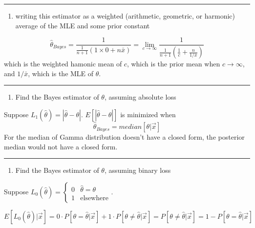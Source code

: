\documentclass[12pt,]{article}
\providecommand{\tightlist}{%
  \setlength{\itemsep}{0pt}\setlength{\parskip}{0pt}}
\begin{document}
\begin{center}\rule{0.5\linewidth}{\linethickness}\end{center}

\begin{enumerate}
\def\labelenumi{\alph{enumi}.}
\setcounter{enumi}{2}
\tightlist
\item
  \textcolor[rgb]{0.5,0.5,0.5}{writing this estimator as a weighted (arithmetic, geometric, or harmonic) average of the MLE and some prior constant}
\end{enumerate}

\[\hat\theta_{Bayes}=\frac1{\frac1{n+1}(1\times0+n\bar x)}=\lim_{c\to\infty}\frac1{\frac1{n+1}(\frac1{c}+\frac{n}{1/\bar x})}\]
which is the weighted hamonic mean of \(c\), which is the prior mean
when \(c\to\infty\), and \(1/\bar x\), which is the MLE of \(\theta\).

\begin{center}\rule{0.5\linewidth}{\linethickness}\end{center}

\begin{enumerate}
\def\labelenumi{\alph{enumi}.}
\setcounter{enumi}{3}
\tightlist
\item
  \textcolor[rgb]{0.5,0.5,0.5}{Find the Bayes estimator of $\theta$, assuming absolute loss}
\end{enumerate}

Suppose \(L_1(\hat\theta)=|\hat\theta-\theta|\).
\(E[|\hat\theta-\theta|]\) is minimized when
\[\hat\theta_{Bayes}=median[\theta|\vec x]\] For the median of Gamma
distribution doesn't have a closed form, the posterior median would not
have a closed form.

\begin{center}\rule{0.5\linewidth}{\linethickness}\end{center}

\begin{enumerate}
\def\labelenumi{\alph{enumi}.}
\setcounter{enumi}{4}
\tightlist
\item
  \textcolor[rgb]{0.5,0.5,0.5}{Find the Bayes estimator of $\theta$, assuming binary loss}
\end{enumerate}

Suppose
\(L_0(\hat\theta)=\begin{cases}0&\hat\theta=\theta\\1&\text{elsewhere}\end{cases}\).

\[E[L_0(\hat\theta)|\vec x]=0\cdot P[\theta=\hat\theta|\vec x]+1\cdot P[\theta\neq\hat\theta|\vec x]=P[\theta\neq\hat\theta|\vec x]=1-P[\theta=\hat\theta|\vec x]\]
\end{document}
